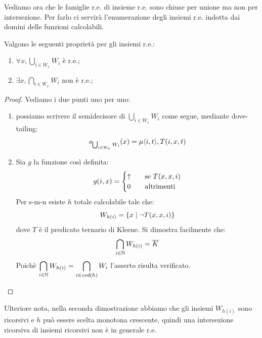 Vediamo ora che le famiglie r.e. di insieme r.e. sono chiuse per unione ma non per intersezione. Per
farlo ci servirà l'enumerazione degli insiemi r.e. indotta dai domini delle funzioni calcolabili.
\begin{lem}
    Valgono le seguenti proprietà per gli insiemi r.e.:
    \begin{enumerate}
        \item $\forall x, \displaystyle\bigcup_{i \in W_{x}}W_{i}$ è r.e.;
        \item $\exists x, \displaystyle\bigcap_{i \in W_{x}}W_{i}$ non è r.e.;
    \end{enumerate}
\end{lem}
\begin{proof}
    Vediamo i due punti uno per uno:
    \begin{enumerate}
        \item possiamo scrivere il semidecisore di $\displaystyle\bigcup_{i \in W_{x}}W_{i}$ come
        segue, mediante dove-tailing:
        \begin{equation*}
            s_{\bigcup_{i \in W_{x}}W_{i}}(x) = \mu \langle i, t \rangle, T(i,x,t)
        \end{equation*}
        \item 
        Sia $g$ la funzione così definita:
        \begin{equation*}
            g(i,x) =
            \begin{cases}
                \uparrow \quad &\text{se $T(x,x,i)$} \\
                0 \quad &\text{altrimenti} \\
            \end{cases}
        \end{equation*}
        Per s-m-n esiste $h$ totale calcolabile tale che:
        \begin{equation*}
            W_{h(i)} = \left\{x \mid \lnot T(x,x,i)\right\}
        \end{equation*}
        dove $T$ è il predicato ternario di Kleene. Si dimostra facilmente che:
        \begin{equation*}
            \bigcap_{i \in \mathbb{N}}W_{h(i)} = \overline{K}
        \end{equation*}
        Poichè $\displaystyle\bigcap_{i \in \mathbb{N}}W_{h(i)} = \displaystyle\bigcap_{i \in
        \textit{cod}(h)}W_{i}$ l'asserto risulta verificato.
    \end{enumerate}
\end{proof}

Ulteriore nota, nella seconda dimostrazione abbiamo che gli insiemi $W_{h(i)}$ sono ricorsivi e $h$
può essere scelta monotona crescente, quindi una intersezione ricorsiva di insiemi ricorsivi non è
in generale r.e.
